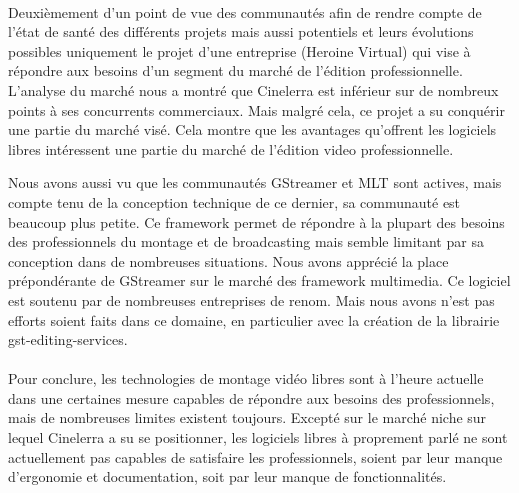\paragraph{}

Deuxièmement d'un point de vue des communautés afin de rendre compte
de l'état de santé des différents projets mais aussi %
potentiels et leurs évolutions possibles %
uniquement le projet d'une entreprise (Heroine Virtual) qui vise
à répondre aux besoins d'un segment du marché de l'édition
professionnelle. L'analyse du marché nous a montré que Cinelerra
est inférieur sur de nombreux points à ses concurrents commerciaux.
Mais malgré cela, ce projet a su conquérir une partie du marché
visé. Cela montre que les avantages qu'offrent les logiciels libres
intéressent une partie du marché de l'édition video professionnelle.


Nous avons aussi vu que les communautés GStreamer et MLT sont actives,
mais compte tenu de la conception technique de ce dernier, sa communauté
est beaucoup plus petite. Ce framework permet de répondre à la plupart
des besoins des professionnels du montage et de broadcasting mais semble
limitant par sa conception dans de nombreuses situations.  Nous avons
apprécié la place prépondérante de GStreamer sur le marché des
framework multimedia. Ce logiciel est soutenu par de nombreuses entreprises
de renom. Mais nous avons %
n'est pas %
efforts soient faits dans ce domaine, en particulier avec la création de
la librairie gst-editing-services.

\paragraph{}

Pour conclure, les technologies de montage vidéo libres sont à l'heure
actuelle dans une certaines mesure capables de répondre aux besoins des
professionnels, mais de nombreuses limites existent toujours. Excepté
sur le marché niche sur lequel Cinelerra a su se positionner, les
logiciels libres à proprement parlé ne sont actuellement pas capables
de satisfaire les professionnels, soient par leur manque d'ergonomie et
documentation, soit par leur manque de fonctionnalités.

\paragraph{}

